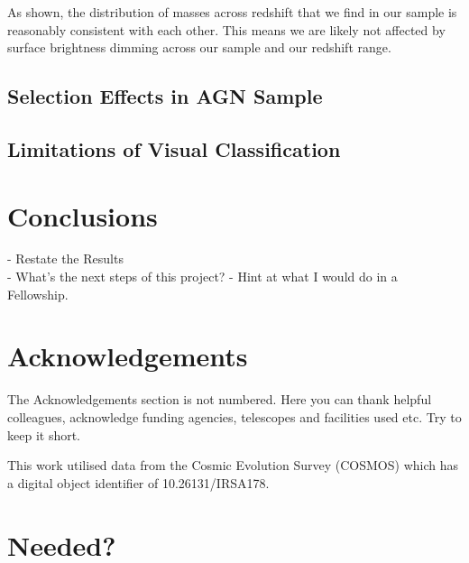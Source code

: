 \documentclass[fleqn,usenatbib]{mnras}
\begin{document}
As shown, the distribution of masses across redshift that we find in our sample is reasonably consistent with each other. This means we are likely not affected by surface brightness dimming across our sample and our redshift range.

\subsection{Selection Effects in AGN Sample}

\subsection{Limitations of Visual Classification}
 
\section{Conclusions}\label{conclusion}
 - Restate the Results \\
 - What's the next steps of this project?
    - Hint at what I would do in a Fellowship.
 
\section*{Acknowledgements}
The Acknowledgements section is not numbered. Here you can thank helpful
colleagues, acknowledge funding agencies, telescopes and facilities used etc.
Try to keep it short.

This work utilised data from the Cosmic Evolution Survey (COSMOS) which has a digital object identifier of 10.26131/IRSA178.







\appendix

\section{Needed?}




\bsp	%
\label{lastpage}
\end{document}
